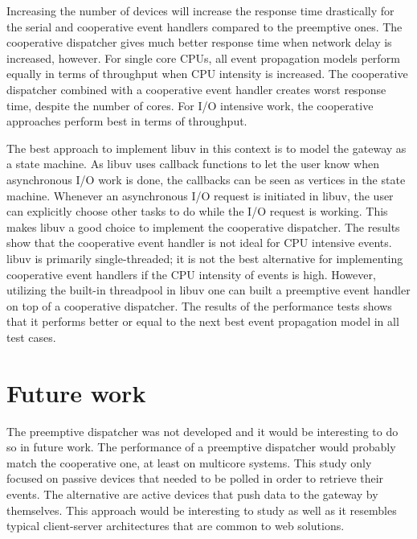 Increasing the number of devices will increase the response time drastically
for the serial and cooperative event handlers compared to the preemptive ones.
The cooperative dispatcher gives much better response time when network delay
is increased, however. For single core CPUs, all event propagation models
perform equally in terms of throughput when CPU intensity is increased. The
cooperative dispatcher combined with a cooperative event handler creates worst
response time, despite the number of cores. For I/O intensive work, the
cooperative approaches perform best in terms of throughput.

The best approach to implement libuv in this context is to model the gateway as
a state machine. As libuv uses callback functions to let the user know when
asynchronous I/O work is done, the callbacks can be seen as vertices in the
state machine. Whenever an asynchronous I/O request is initiated in libuv, the
user can explicitly choose other tasks to do while the I/O request is working.
This makes libuv a good choice to implement the cooperative dispatcher. The
results show that the cooperative event handler is not ideal for CPU intensive
events. libuv is primarily single-threaded; it is not the best alternative for
implementing cooperative event handlers if the CPU intensity of events is high.
However, utilizing the built-in threadpool in libuv one can built a preemptive
event handler on top of a cooperative dispatcher. The results of the
performance tests shows that it performs better or equal to the next best event
propagation model in all test cases.

\section{Future work}

The preemptive dispatcher was not developed and it would be interesting to do
so in future work. The performance of a preemptive dispatcher would probably
match the cooperative one, at least on multicore systems. This study only
focused on passive devices that needed to be polled in order to retrieve their
events. The alternative are active devices that push data to the gateway by
themselves. This approach would be interesting to study as well as it resembles
typical client-server architectures that are common to web solutions.
